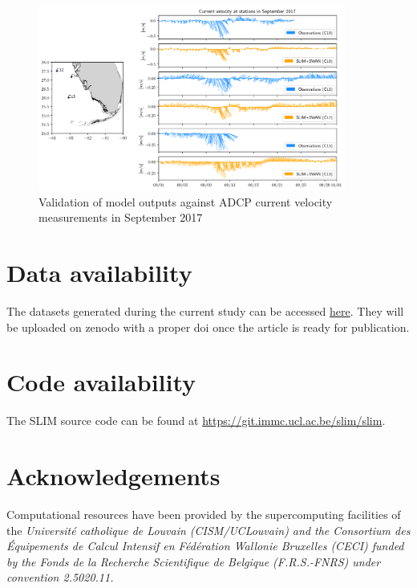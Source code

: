 \documentclass[fleqn,10pt]{wlscirep}
\begin{document}
\begin{figure}
    \centering
    \includegraphics[width=0.9\textwidth]{figures/validation_uv_map.png}
    \caption{Validation of model outputs against ADCP current velocity measurements in September 2017}
    \label{fig:validation}
\end{figure}


\section*{Data availability}
The datasets generated during the current study can be accessed \href{https://uclouvain-my.sharepoint.com/:f:/g/personal/thomas_dobbelaere_uclouvain_be/EuRwpuKKnytJvnkfshpBeA8BhwYU19c5sLEe8n3fnPmkjQ?e=pIUMxM}{here}. They will be uploaded on zenodo with a proper doi once the article is ready for publication.


\section*{Code availability}
The SLIM source code can be found at \href{https://git.immc.ucl.ac.be/slim/slim}{https://git.immc.ucl.ac.be/slim/slim}.





\section*{Acknowledgements}
Computational resources have been provided by the supercomputing facilities of the \it{Universit\'e catholique de Louvain} (CISM/UCLouvain) and the \it{Consortium des \'Equipements de Calcul Intensif en F\'ed\'eration Wallonie Bruxelles} (CECI) funded by the \it{Fonds de la Recherche Scientifique de Belgique} (F.R.S.-FNRS) under convention 2.5020.11.
\end{document}
